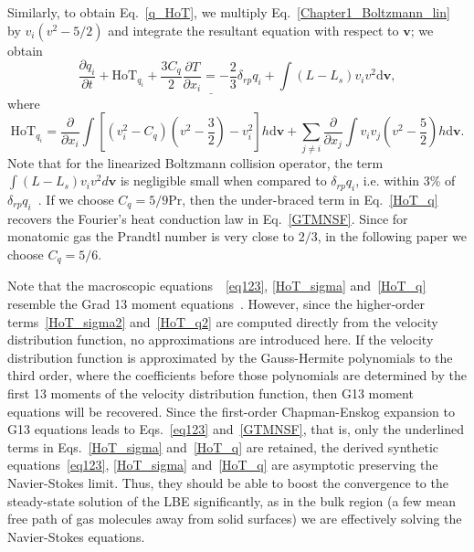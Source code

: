 Similarly, to obtain Eq.~\eqref{q_HoT}, we multiply Eq.~\eqref{Chapter1_Boltzmann_lin} by $v_i(v^2-5/2)$ and integrate the resultant equation with respect to $\bm{v}$; we obtain 
\begin{equation}\label{HoT_q}
\frac{\partial q_{i}}{\partial {t}}+\text{HoT}_{q_i}
+\underline{\frac{3C_q}{2}\frac{\partial{T}}{\partial {x_{i}}}=-\frac{2}{3}\delta_{rp}q_{i}}+\int{(L-L_s)v_iv^2} \mathrm{d}\bm{v},
\end{equation}
where 
\begin{equation}\label{HoT_q2}
\text{HoT}_{q_i}=\frac{\partial}{\partial{x_i}}\int\left[(v_i^2-C_q)\left(v^2-\frac{3}{2}\right)-v_i^2\right]h\mathrm{d}\bm{v}+\sum_{j\neq{i}}\frac{\partial}{\partial{x_j}}\int{}v_iv_j\left(v^2-\frac{5}{2}\right)h\mathrm{d}\bm{v}.
\end{equation}
Note that for the linearized Boltzmann collision operator, the term $\int{(L-L_s)v_iv^2} d\bm{v}$ is negligible small when compared to $\delta_{rp}q_{i}$, i.e. within 3\% of $\delta_{rp}q_{i}$~\cite{CE}. If we choose $C_q=5/9\mathrm{Pr}$, then the under-braced term in Eq.~\eqref{HoT_q} recovers the Fourier's heat conduction law in Eq.~\eqref{GTMNSF}. Since for monatomic gas the Prandtl number is very close to $2/3$, in the following paper we choose $C_q=5/6$. 


Note that the macroscopic equations~~\eqref{eq123}, \eqref{HoT_sigma} and~\eqref{HoT_q} resemble the Grad 13 moment equations~\cite{Grad1949,henning}. However, since the higher-order terms~\eqref{HoT_sigma2} and~\eqref{HoT_q2}  are computed directly from the velocity distribution function, no approximations are introduced here. If the velocity distribution function is approximated by the Gauss-Hermite polynomials to the third order, where the coefficients before those polynomials are determined by the first 13 moments of the velocity distribution function, then G13 moment equations will be recovered.  Since the first-order Chapman-Enskog expansion to G13 equations leads to Eqs.~\eqref{eq123} and~\eqref{GTMNSF}, that is, only the underlined terms in Eqs.~\eqref{HoT_sigma} and~\eqref{HoT_q} are retained, the derived synthetic equations~\eqref{eq123}, \eqref{HoT_sigma} and~\eqref{HoT_q} are asymptotic preserving the Navier-Stokes limit. Thus, they should be able to boost the convergence to the steady-state solution of the LBE significantly, as in the bulk region (a few mean free path of gas molecules away from  solid surfaces) we are effectively solving the Navier-Stokes equations.


